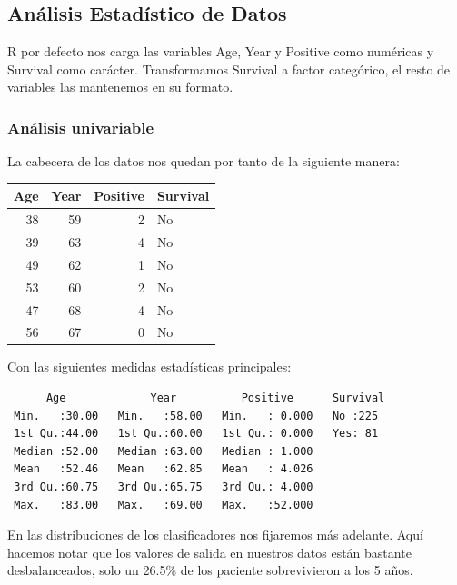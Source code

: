 \subsection{Análisis Estadístico de Datos}

R por defecto nos carga las variables Age, Year y Positive como numéricas y Survival como carácter.
Transformamos Survival a factor categórico, el resto de variables las mantenemos en su formato.

\subsubsection{Análisis univariable}

La cabecera de los datos nos quedan por tanto de la siguiente manera:
\vspace{\baselineskip}

\begin{tabular}{r|r|r|l}
    \hline
    Age & Year & Positive & Survival\\
    \hline
    38 & 59 & 2 & No\\
    \hline
    39 & 63 & 4 & No\\
    \hline
    49 & 62 & 1 & No\\
    \hline
    53 & 60 & 2 & No\\
    \hline
    47 & 68 & 4 & No\\
    \hline
    56 & 67 & 0 & No\\
    \hline
\end{tabular}

\vspace{\baselineskip}

Con las siguientes medidas estadísticas principales:

\begin{verbatim}
      Age             Year          Positive      Survival 
 Min.   :30.00   Min.   :58.00   Min.   : 0.000   No :225  
 1st Qu.:44.00   1st Qu.:60.00   1st Qu.: 0.000   Yes: 81  
 Median :52.00   Median :63.00   Median : 1.000            
 Mean   :52.46   Mean   :62.85   Mean   : 4.026            
 3rd Qu.:60.75   3rd Qu.:65.75   3rd Qu.: 4.000            
 Max.   :83.00   Max.   :69.00   Max.   :52.000            
\end{verbatim}

En las distribuciones de los clasificadores nos fijaremos más adelante. Aquí hacemos notar que los valores de salida en nuestros datos están bastante desbalanceados, solo un 26.5\% de los paciente sobrevivieron a los 5 años.

